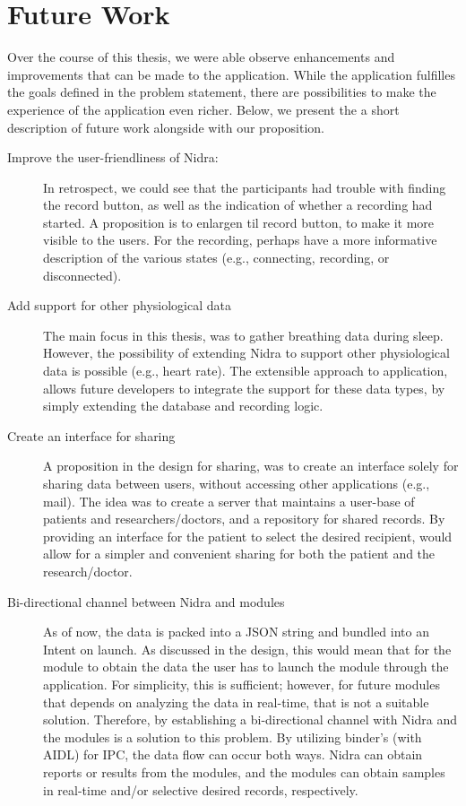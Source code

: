 \section{Future Work}
Over the course of this thesis, we were able observe enhancements and improvements that can be made to the application. While the application fulfilles the goals defined in the problem statement, there are possibilities to make the experience of the application even richer. Below, we present the a short description of future work alongside with our proposition. 


\begin{description}
    \item[Improve the user-friendliness of Nidra:] In retrospect, we could see that the participants had trouble with finding the record button, as well as the indication of whether a recording had started. A proposition is to enlargen til record button, to make it more visible to the users. For the recording, perhaps have a more informative description of the various states (e.g., connecting, recording, or disconnected). 
    \item[Add support for other physiological data] The main focus in this thesis, was to gather breathing data during sleep. However, the possibility of extending Nidra to support other physiological data is possible (e.g., heart rate). The extensible approach to application, allows future developers to integrate the support for these data types, by simply extending the database and recording logic. 
    \item[Create an interface for sharing] A proposition in the design for sharing, was to create an interface solely for sharing data between users, without accessing other applications (e.g., mail). The idea was to create a server that maintains a user-base of patients and researchers/doctors, and a repository for shared records. By providing an interface for the patient to select the desired recipient, would allow for a simpler and convenient sharing for both the patient and the research/doctor. 
    \item[Bi-directional channel between Nidra and modules] As of now, the data is packed into a JSON string and bundled into an Intent on launch. As discussed in the design, this would mean that for the module to obtain the data the user has to launch the module through the application. For simplicity, this is sufficient; however, for future modules that depends on analyzing the data in real-time, that is not a suitable solution. Therefore, by establishing a bi-directional channel with Nidra and the modules is a solution to this problem. By utilizing binder's (with AIDL) for IPC, the data flow can occur both ways. Nidra can obtain reports or results from the modules, and the modules can obtain samples in real-time and/or selective desired records, respectively. 

\end{description}
